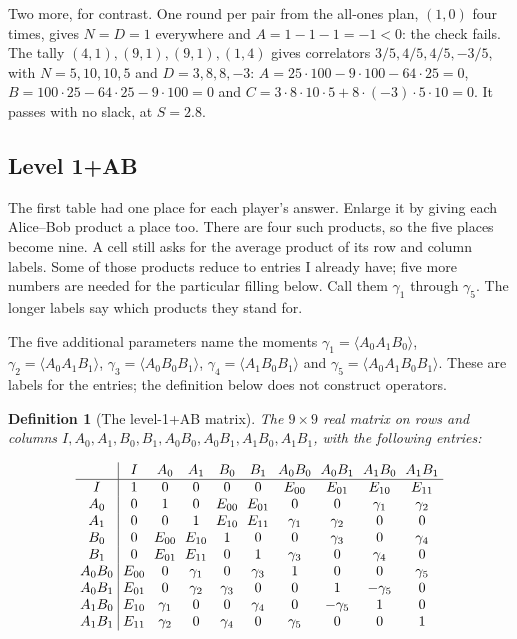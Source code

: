 \documentclass[11pt,twoside]{article}
\theoremstyle{thielethm}
\theoremstyle{thieledef}
\newtheorem{definition}{Definition}[section]
\theoremstyle{thieledef}
\theoremstyle{thieledef}
\theoremstyle{thielethm}
\theoremstyle{thieleobs}
\theoremstyle{thielethm}
\begin{document}
Two more, for contrast. One round per pair from the all-ones plan, $(1,0)$ four times, gives
$N = D = 1$ everywhere and $A = 1 - 1 - 1 = -1 < 0$: the check fails. The tally $(4,1), (9,1), (9,1),
(1,4)$ gives correlators $3/5, 4/5, 4/5, -3/5$, with $N = 5, 10, 10, 5$ and
$D = 3, 8, 8, -3$:
$A = 25 \cdot 100 - 9 \cdot 100 - 64 \cdot 25 = 0$,
$B = 100 \cdot 25 - 64 \cdot 25 - 9 \cdot 100 = 0$ and
$C = 3 \cdot 8 \cdot 10 \cdot 5 + 8 \cdot (-3) \cdot 5 \cdot 10 = 0$. It passes with no
slack, at $S = 2.8$.

\subsection{Level 1+AB}


The first table had one place for each player's answer. Enlarge it by giving
each Alice--Bob product a place too. There are four such products, so the
five places become nine. A cell still asks for the average product of its
row and column labels. Some of those products reduce to entries I already
have; five more numbers are needed for the particular filling below.
Call them $\gamma_1$ through $\gamma_5$. The longer labels say which
products they stand for.

The five additional parameters name the moments
$\gamma_1=\langle A_0 A_1 B_0\rangle$,
$\gamma_2=\langle A_0 A_1 B_1\rangle$,
$\gamma_3=\langle A_0 B_0 B_1\rangle$,
$\gamma_4=\langle A_1 B_0 B_1\rangle$ and
$\gamma_5=\langle A_0 A_1 B_0 B_1\rangle$.
These are labels for the entries; the definition below does not construct operators.

\begin{definition}[The level-1+AB matrix]
The $9 \times 9$ real matrix on rows and
columns $I, A_0, A_1, B_0, B_1, A_0B_0, A_0B_1, A_1B_0, A_1B_1$, with the following entries:
\end{definition}

\[
\setlength{\arraycolsep}{3.2pt}
\begin{array}{c|ccccccccc}
 & I & A_0 & A_1 & B_0 & B_1 & A_0B_0 & A_0B_1 & A_1B_0 & A_1B_1 \\ \hline
I      & 1 & 0 & 0 & 0 & 0 & E_{00} & E_{01} & E_{10} & E_{11} \\
A_0    & 0 & 1 & 0 & E_{00} & E_{01} & 0 & 0 & \gamma_1 & \gamma_2 \\
A_1    & 0 & 0 & 1 & E_{10} & E_{11} & \gamma_1 & \gamma_2 & 0 & 0 \\
B_0    & 0 & E_{00} & E_{10} & 1 & 0 & 0 & \gamma_3 & 0 & \gamma_4 \\
B_1    & 0 & E_{01} & E_{11} & 0 & 1 & \gamma_3 & 0 & \gamma_4 & 0 \\
A_0B_0 & E_{00} & 0 & \gamma_1 & 0 & \gamma_3 & 1 & 0 & 0 & \gamma_5 \\
A_0B_1 & E_{01} & 0 & \gamma_2 & \gamma_3 & 0 & 0 & 1 & -\gamma_5 & 0 \\
A_1B_0 & E_{10} & \gamma_1 & 0 & 0 & \gamma_4 & 0 & -\gamma_5 & 1 & 0 \\
A_1B_1 & E_{11} & \gamma_2 & 0 & \gamma_4 & 0 & \gamma_5 & 0 & 0 & 1
\end{array}
\]
\end{document}
